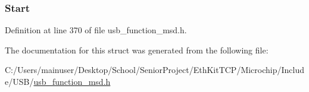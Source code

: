 \subsubsection[{Start}]{ Start}\label{struct_stop_start_c_b_a0f967bae823a6ead3de270c3afe9435d}


Definition at line 370 of file usb\+\_\+function\+\_\+msd.\+h.



The documentation for this struct was generated from the following file\+:\begin{DoxyCompactItemize}
\item 
C\+:/\+Users/mainuser/\+Desktop/\+School/\+Senior\+Project/\+Eth\+Kit\+T\+C\+P/\+Microchip/\+Include/\+U\+S\+B/\hyperlink{usb__function__msd_8h}{usb\+\_\+function\+\_\+msd.\+h}\end{DoxyCompactItemize}
